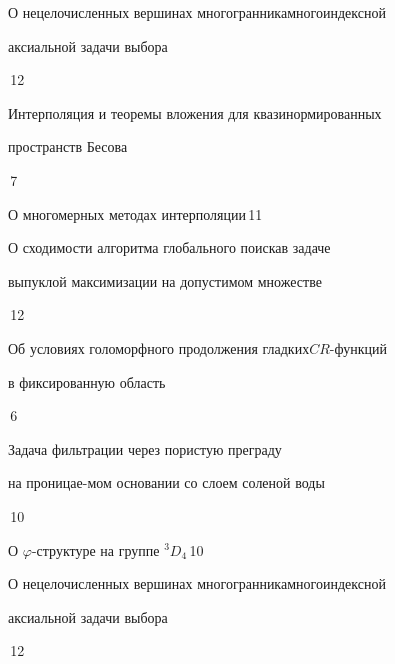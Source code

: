 

{О нецелочисленных вершинах многогранника\newline многоиндексной


аксиальной задачи выбора}{\No\,12}




{Интерполяция и теоремы вложения для квазинормированных\newline


пространств Бесова}{\No\,7}




{О многомерных методах интерполяции}{\No\,11}




{О сходимости алгоритма глобального поиска\newline в задаче


выпуклой максимизации на допустимом множестве}{\No\,12}








{Об условиях голоморфного продолжения гладких\newline $CR$-функций


в фиксированную область}{\No\,6}




{Задача фильтрации через пористую преграду


на проницае-\newline мом основании со слоем соленой воды}{\No\,10}




{О $\varphi$-структуре на группе $^3D_4$}{\No\,10}






{О нецелочисленных вершинах многогранника\newline многоиндексной


аксиальной задачи выбора}{\No\,12}


